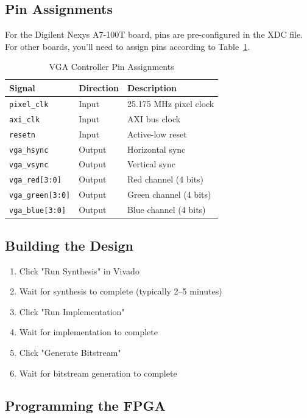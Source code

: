 \documentclass[11pt,letterpaper]{report}
\begin{document}
\subsection{Pin Assignments}

For the Digilent Nexys A7-100T board, pins are pre-configured in the XDC file. For other boards, you'll need to assign pins according to Table~\ref{tab:pins}.

\begin{table}[tbp]
\centering
\caption{VGA Controller Pin Assignments}
\label{tab:pins}
\begin{tabular}{lll}
\toprule
\textbf{Signal} & \textbf{Direction} & \textbf{Description} \\
\midrule
\texttt{pixel\_clk} & Input & 25.175 MHz pixel clock \\
\texttt{axi\_clk} & Input & AXI bus clock \\
\texttt{resetn} & Input & Active-low reset \\
\texttt{vga\_hsync} & Output & Horizontal sync \\
\texttt{vga\_vsync} & Output & Vertical sync \\
\texttt{vga\_red[3:0]} & Output & Red channel (4 bits) \\
\texttt{vga\_green[3:0]} & Output & Green channel (4 bits) \\
\texttt{vga\_blue[3:0]} & Output & Blue channel (4 bits) \\
\bottomrule
\end{tabular}
\end{table}

\subsection{Building the Design}

\begin{enumerate}
    \item Click "Run Synthesis" in Vivado
    \item Wait for synthesis to complete (typically 2--5 minutes)
    \item Click "Run Implementation"
    \item Wait for implementation to complete
    \item Click "Generate Bitstream"
    \item Wait for bitstream generation to complete
\end{enumerate}

\subsection{Programming the FPGA}
\end{document}

